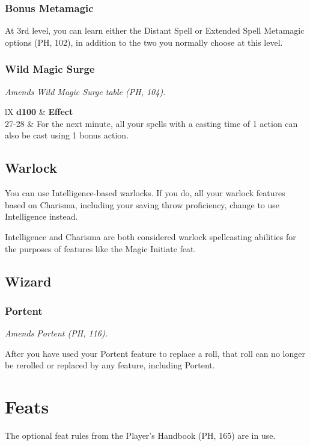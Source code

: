 \documentclass[letterpaper,twocolumn,openany,nodeprecatedcode]{dndbook}
\begin{document}
\subsubsection{Bonus Metamagic}
At 3rd level, you can learn either the Distant Spell or Extended Spell Metamagic options (PH, 102), in addition to the two you normally choose at this level.

\subsubsection{Wild Magic Surge}
\textit{Amends Wild Magic Surge table (PH, 104).}

\begin{DndTable}[]{lX}
    \textbf{d100} & \textbf{Effect} \\
    27-28 & For the next minute, all your spells with a casting time of 1 action can also be cast using 1 bonus action.
\end{DndTable}

\subsection{Warlock}

You can use Intelligence-based warlocks. If you do, all your warlock features based on Charisma, including your saving throw proficiency, change to use Intelligence instead.

Intelligence and Charisma are both considered warlock spellcasting abilities for the purposes of features like the Magic Initiate feat.

\subsection{Wizard}

\subsubsection{Portent}
\textit{Amends Portent (PH, 116).}

After you have used your Portent feature to replace a roll, that roll can no longer be rerolled or replaced by any feature, including Portent.




\section{Feats}
The optional feat rules from the Player's Handbook (PH, 165) are in use.
\end{document}
